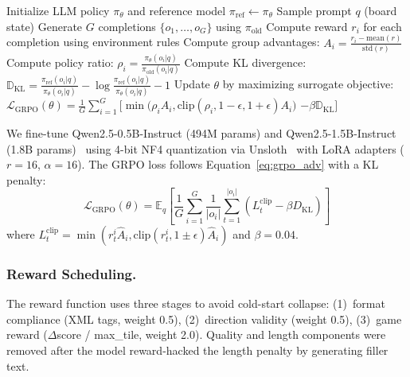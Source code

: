 \documentclass[letterpaper]{article}
\begin{document}
\begin{algorithm}[htbp]
\caption{Group Relative Policy Optimization (GRPO)}
\label{alg:grpo}
\begin{algorithmic}[1]
\State Initialize LLM policy $\pi_\theta$ and reference model $\pi_{\text{ref}} \leftarrow \pi_\theta$
    \State Sample prompt $q$ (board state)
    \State Generate $G$ completions $\{o_1, \ldots, o_G\}$ using $\pi_{\text{old}}$
    \State Compute reward $r_i$ for each completion using environment rules
    \State Compute group advantages: $A_i = \frac{r_i - \text{mean}(r)}{\text{std}(r)}$
    \State Compute policy ratio: $\rho_i = \frac{\pi_\theta(o_i|q)}{\pi_{\text{old}}(o_i|q)}$
    \State Compute KL divergence: $\mathbb{D}_{\text{KL}} = \frac{\pi_{\text{ref}}(o_i|q)}{\pi_\theta(o_i|q)} - \log \frac{\pi_{\text{ref}}(o_i|q)}{\pi_\theta(o_i|q)} - 1$
    \State Update $\theta$ by maximizing surrogate objective:
    \State $\mathcal{L}_{\text{GRPO}}(\theta) = \frac{1}{G} \sum_{i=1}^G \Big[ \min\big(\rho_i A_i, \text{clip}(\rho_i, 1-\epsilon, 1+\epsilon) A_i\big)$
    \State \qquad $- \beta \mathbb{D}_{\text{KL}} \Big]$
\EndFor
\end{algorithmic}
\end{algorithm}

We fine-tune Qwen2.5-0.5B-Instruct (494M params) and Qwen2.5-1.5B-Instruct (1.8B params)~\cite{qwen2024} using 4-bit NF4 quantization via Unsloth~\cite{unsloth2024} with LoRA adapters ($r{=}16$, $\alpha{=}16$). The GRPO loss follows Equation~\ref{eq:grpo_adv} with a KL penalty:
\begin{equation}
    \mathcal{L}_{\text{GRPO}}(\theta) = \mathbb{E}_q\!\left[\frac{1}{G}\sum_{i=1}^G \frac{1}{|o_i|}\sum_{t=1}^{|o_i|}\!\left(L_t^{\text{clip}} - \beta D_{\text{KL}}\right)\right]
\end{equation}
where $L_t^{\text{clip}} = \min(r_t^i \hat{A}_i, \text{clip}(r_t^i, 1{\pm}\epsilon)\hat{A}_i)$ and $\beta{=}0.04$.

\subsubsection{Reward Scheduling.}

The reward function uses three stages to avoid cold-start collapse: (1)~format compliance (XML tags, weight 0.5), (2)~direction validity (weight 0.5), (3)~game reward ($\Delta$score / max\_tile, weight 2.0). Quality and length components were removed after the model reward-hacked the length penalty by generating filler text.
\end{document}
